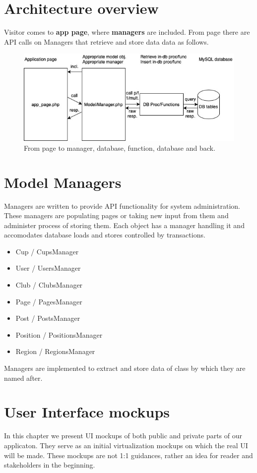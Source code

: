 \section{Architecture overview}
Visitor comes to \textbf{app page}, where \textbf{managers} are included. From page there are API calls on Managers that retrieve and store data data as follows.
\newline
\begin{figure}[h]	
	\centering	
    \includegraphics[scale=0.707]{img/app-schema.jpg}
	\caption{From page to manager, database, function, database and back.}
	\label{fig2.1:appschema}
\end{figure}
\section{Model Managers}
Managers are written to provide API functionality for system administration. These managers are populating pages or taking new input from them and administer process of storing them. Each object has a manager handling it and accomodates database loads and stores controlled by transactions.
\begin{itemize}
    \item Cup / CupsManager
    \item User / UsersManager
    \item Club / ClubsManager
    \item Page / PagesManager
    \item Post / PostsManager
    \item Position / PositionsManager
    \item Region / RegionsManager
\end{itemize}
Managers are implemented to extract and store data of class by which they are named after.
\newpage
\section{User Interface mockups}
In this chapter we present UI mockups of both public and private parts of our applicaton. They serve as an initial virtualization mockups on which the real UI will be made. These mockups are not 1:1 guidances, rather an idea for reader and stakeholders in the beginning.  
